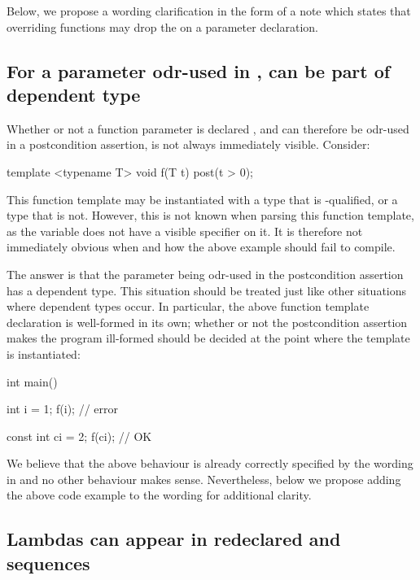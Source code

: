 Below, we propose a wording clarification in the form of a note which states that overriding functions may drop the  on a parameter declaration.

\subsection{For a parameter odr-used in ,  can be part of dependent type}

Whether or not a function parameter is declared , and can therefore be odr-used in a postcondition assertion, is not always immediately visible. Consider:
\begin{codeblock}
template <typename T> 
void f(T t) post(t > 0); 
\end{codeblock}
This function template may be instantiated with a type that is -qualified, or a type that is not. However, this is not known when parsing this function template, as the variable  does not have a visible  specifier on it. It is therefore not immediately obvious when and how the above example should fail to compile.

The answer is that the parameter  being odr-used in the postcondition assertion has a dependent type. This situation should be treated just like other situations where dependent types occur. In particular, the above function template declaration is well-formed in its own; whether or not the postcondition assertion makes the program ill-formed should be decided at the point where the template is instantiated:
\begin{codeblock}
int main() {
  int i = 1;
  f(i);   // error

  const int ci = 2;
  f(ci);  // OK
}
\end{codeblock}
We believe that the above behaviour is already correctly specified by the wording in \cite{P2900R10} and no other behaviour makes sense. Nevertheless, below we propose adding the above code example to the wording for additional clarity.

\subsection{Lambdas can appear in redeclared  and  sequences}

